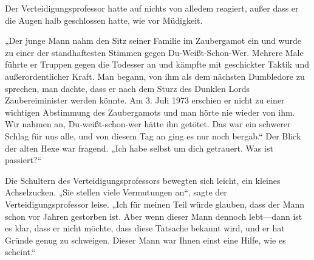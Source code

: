 Der Verteidigungsprofessor hatte auf nichts von alledem reagiert, außer dass er die Augen halb geschlossen hatte, wie vor Müdigkeit.

„Der junge Mann nahm den Sitz seiner Familie im Zaubergamot ein und wurde zu einer der standhaftesten Stimmen gegen Du-Weißt-Schon-Wer. Mehrere Male führte er Truppen gegen die Todesser an und kämpfte mit geschickter Taktik und außerordentlicher Kraft. Man begann, von ihm als dem nächsten Dumbledore zu sprechen, man dachte, dass er nach dem Sturz des Dunklen Lords Zaubereiminister werden könnte. Am 3. Juli 1973 erschien er nicht zu einer wichtigen Abstimmung des Zaubergamots und man hörte nie wieder von ihm. Wir nahmen an, Du-weißt-schon-wer hätte ihn getötet. Das war ein schwerer Schlag für uns alle, und von diesem Tag an ging es nur noch bergab.“
Der Blick der alten Hexe war fragend.
„Ich habe selbst um dich getrauert. Was ist passiert?“

Die Schultern des Verteidigungsprofessors bewegten sich leicht, ein kleines Achselzucken. „Sie stellen viele Vermutungen an“, sagte der Verteidigungsprofessor leise. „Ich für meinen Teil würde glauben, dass der Mann schon vor Jahren gestorben ist. Aber wenn dieser Mann dennoch lebt—dann ist es klar, dass er nicht möchte, dass diese Tatsache bekannt wird, und er hat Gründe genug zu schweigen. Dieser Mann war Ihnen einst eine Hilfe, wie es scheint.“

